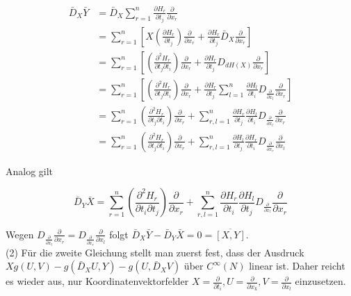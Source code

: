 \documentclass[10pt]{article}
\begin{document}
$$
\begin{aligned}
\bar{D}_{X} \bar{Y} & =\bar{D}_{X} \sum_{r=1}^{n} \frac{\partial H_{r}}{\partial t_{j}} \frac{\partial}{\partial x_{r}} \\
& =\sum_{r=1}^{n}\left[X\left(\frac{\partial H_{r}}{\partial t_{j}}\right) \frac{\partial}{\partial x_{r}}+\frac{\partial H_{r}}{\partial t_{j}} \bar{D}_{X} \frac{\partial}{\partial x_{r}}\right] \\
& =\sum_{r=1}^{n}\left[\left(\frac{\partial^{2} H_{r}}{\partial t_{j} \partial t_{i}}\right) \frac{\partial}{\partial x_{r}}+\frac{\partial H_{r}}{\partial t_{j}} D_{d H(X)} \frac{\partial}{\partial x_{r}}\right] \\
& =\sum_{r=1}^{n}\left[\left(\frac{\partial^{2} H_{r}}{\partial t_{j} \partial t_{i}}\right) \frac{\partial}{\partial x_{r}}+\frac{\partial H_{r}}{\partial t_{j}} \sum_{l=1}^{n} \frac{\partial H_{l}}{\partial t_{i}} D_{\frac{\partial}{\partial x_{l}}} \frac{\partial}{\partial x_{r}}\right] \\
& =\sum_{r=1}^{n}\left(\frac{\partial^{2} H_{r}}{\partial t_{j} \partial t_{i}}\right) \frac{\partial}{\partial x_{r}}+\sum_{r, l=1}^{n} \frac{\partial H_{r}}{\partial t_{j}} \frac{\partial H_{l}}{\partial t_{i}} D_{\frac{\partial}{\partial x_{l}}} \frac{\partial}{\partial x_{r}} \\
& =\sum_{r=1}^{n}\left(\frac{\partial^{2} H_{r}}{\partial t_{j} \partial t_{i}}\right) \frac{\partial}{\partial x_{r}}+\sum_{r, l=1}^{n} \frac{\partial H_{l}}{\partial t_{j}} \frac{\partial H_{r}}{\partial t_{i}} D_{\frac{\partial}{\partial x_{r}}} \frac{\partial}{\partial x_{l}}
\end{aligned}
$$

Analog gilt

$$
\bar{D}_{Y} \bar{X}=\sum_{r=1}^{n}\left(\frac{\partial^{2} H_{r}}{\partial t_{i} \partial t_{j}}\right) \frac{\partial}{\partial x_{r}}+\sum_{r, l=1}^{n} \frac{\partial H_{r}}{\partial t_{i}} \frac{\partial H_{l}}{\partial t_{j}} D_{\frac{\partial}{\partial x_{l}}} \frac{\partial}{\partial x_{r}}
$$

Wegen $D_{\frac{\partial}{\partial x_{l}}} \frac{\partial}{\partial x_{r}}=D_{\frac{\partial}{\partial x_{r}}} \frac{\partial}{\partial x_{l}}$ folgt $\bar{D}_{X} \bar{Y}-\bar{D}_{Y} \bar{X}=0=\overline{[X, Y]}$.\\
(2) Für die zweite Gleichung stellt man zuerst fest, dass der Ausdruck $X g(U, V)-g\left(\bar{D}_{X} U, Y\right)-g\left(U, \bar{D}_{X} V\right)$ über $C^{\infty}(N)$ linear ist. Daher reicht es wieder aus, nur Koordinatenvektorfelder $X=\frac{\partial}{\partial t_{i}}, U=\frac{\partial}{\partial x_{k}}, V=\frac{\partial}{\partial x_{l}}$ einzusetzen.
\end{document}
